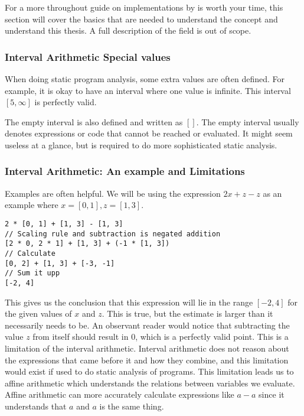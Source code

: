 For a more throughout guide on implementations  by \citeauthor{src:affAri} is worth your time, this section will cover the basics that are needed to understand the concept and understand this thesis. A full description of the field is out of scope.

\subsubsection{Interval Arithmetic Special values}
When doing static program analysis, some extra values are often defined. For example, it is okay to have an interval where one value is infinite. This interval $[5, \infty]$ is perfectly valid.

The empty interval is also defined and written as $[]$. The empty interval usually denotes expressions or code that cannot be reached or evaluated. It might seem useless at a glance, but is required to do more sophisticated static analysis.

\subsubsection{Interval Arithmetic: An example and Limitations}
Examples are often helpful.
We will be using the expression $2x + z - z$ as an example where $x = [0, 1], z = [1, 3]$.

\begin{verbatim}
2 * [0, 1] + [1, 3] - [1, 3]
// Scaling rule and subtraction is negated addition 
[2 * 0, 2 * 1] + [1, 3] + (-1 * [1, 3])
// Calculate
[0, 2] + [1, 3] + [-3, -1]
// Sum it upp
[-2, 4]
\end{verbatim}

This gives us the conclusion that this expression will lie in the range $[-2, 4]$ for the given values of $x$ and $z$. This is true, but the estimate is larger than it necessarily needs to be. An observant reader would notice that subtracting the value $z$ from itself should result in $0$, which is a perfectly valid point. This is a limitation of the interval arithmetic. Interval arithmetic does not reason about the expressions that came before it and how they combine, and this limitation would exist if used to do static analysis of programs. This limitation leads us to affine arithmetic which understands the relations between variables we evaluate. Affine arithmetic can more accurately calculate expressions like $a - a$ since it understands that $a$ and $a$ is the same thing.


